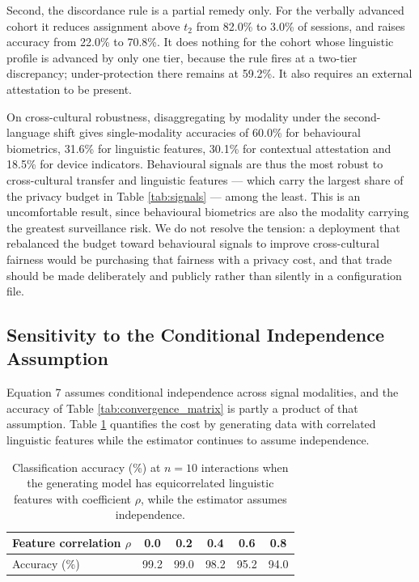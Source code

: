 \documentclass[fleqn,10pt]{wlscirep}
\begin{document}
Second, the discordance rule is a partial remedy only. For the verbally advanced cohort it reduces assignment above $t_2$ from 82.0\% to 3.0\% of sessions, and raises accuracy from 22.0\% to 70.8\%. It does nothing for the cohort whose linguistic profile is advanced by only one tier, because the rule fires at a two-tier discrepancy; under-protection there remains at 59.2\%. It also requires an external attestation to be present.

On cross-cultural robustness, disaggregating by modality under the second-language shift gives single-modality accuracies of 60.0\% for behavioural biometrics, 31.6\% for linguistic features, 30.1\% for contextual attestation and 18.5\% for device indicators. Behavioural signals are thus the most robust to cross-cultural transfer and linguistic features --- which carry the largest share of the privacy budget in Table \ref{tab:signals} --- among the least. This is an uncomfortable result, since behavioural biometrics are also the modality carrying the greatest surveillance risk. We do not resolve the tension: a deployment that rebalanced the budget toward behavioural signals to improve cross-cultural fairness would be purchasing that fairness with a privacy cost, and that trade should be made deliberately and publicly rather than silently in a configuration file.

\subsection*{Sensitivity to the Conditional Independence Assumption}

Equation 7 assumes conditional independence across signal modalities, and the accuracy of Table \ref{tab:convergence_matrix} is partly a product of that assumption. Table \ref{tab:independence} quantifies the cost by generating data with correlated linguistic features while the estimator continues to assume independence.

\begin{table}[H]
\centering
\caption{Classification accuracy (\%) at $n = 10$ interactions when the generating model has equicorrelated linguistic features with coefficient $\rho$, while the estimator assumes independence.}
\label{tab:independence}
\begin{tabular}{lccccc}
\hline
Feature correlation $\rho$ & 0.0 & 0.2 & 0.4 & 0.6 & 0.8 \\
\hline
Accuracy (\%) & 99.2 & 99.0 & 98.2 & 95.2 & 94.0 \\
\hline
\end{tabular}
\end{table}
\end{document}
